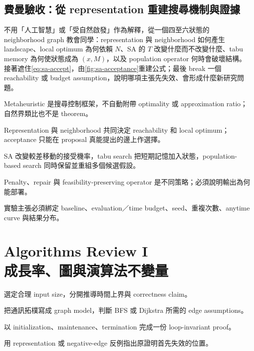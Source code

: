 \documentclass[11pt,a4paper,oneside,openany]{book}
\begin{document}
\section{費曼驗收：從 representation 重建搜尋機制與證據}
\begin{feynmancheck}
不用「人工智慧」或「受自然啟發」作為解釋，從一個四至六狀態的 neighborhood graph 教會同學：representation 與 neighborhood 如何產生 landscape、local optimum 為何依賴 $N$、SA 的 $T$ 改變什麼而不改變什麼、tabu memory 為何使狀態成為 $(x,M)$，以及 population operator 何時會破壞結構。接著遮住\cref{eq:sa-accept}，由\cref{fig:sa-acceptance}重建公式；最後 break 一個 reachability 或 budget assumption，說明哪項主張先失效、會形成什麼新研究問題。
\end{feynmancheck}
\begin{chapterrecap}
\item Metaheuristic 是搜尋控制框架，不自動附帶 optimality 或 approximation ratio；自然界類比也不是 theorem。
\item Representation 與 neighborhood 共同決定 reachability 和 local optimum；acceptance 只能在 proposal 真能提出的邊上作選擇。
\item SA 改變較差移動的接受機率，tabu search 把短期記憶加入狀態，population-based search 同時保留並重組多個候選假設。
\item Penalty、repair 與 feasibility-preserving operator 是不同策略；必須說明輸出為何能部署。
\item 實驗主張必須綁定 baseline、evaluation／time budget、seed、重複次數、anytime curve 與結果分布。
\end{chapterrecap}

\chapter[Algorithms Review I：成長率、圖與演算法不變量]
  {Algorithms Review I\\成長率、圖與演算法不變量}
\label{ch:review-foundations}
\begin{chaptermastery}
\item 選定合理 input size，分開推導時間上界與 correctness claim。
\item 把通訊拓樸寫成 graph model，判斷 BFS 或 Dijkstra 所需的 edge assumptions。
\item 以 initialization、maintenance、termination 完成一份 loop-invariant proof。
\item 用 representation 或 negative-edge 反例指出原證明首先失效的位置。
\end{chaptermastery}
\end{document}
